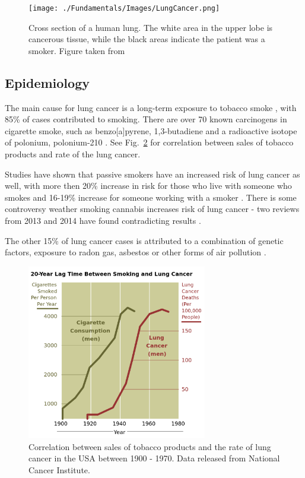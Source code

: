 \begin{figure}[H]
\begin{center}
\texttt{[image: ./Fundamentals/Images/LungCancer.png]}
\caption{Cross section of a human lung. The white area in the upper lobe is cancerous tissue, while the black areas indicate the patient was a smoker. Figure taken from \cite{LungCancer}}
\label{Fig:Cancer}
\end{center}
\end{figure}


\subsection{Epidemiology}

The main cause for lung cancer is a long-term exposure to tobacco smoke \cite{Tsao2008}, with 85\% of cases contributed to smoking. There are over 70 known carcinogens in cigarette smoke, such as benzo[a]pyrene, 1,3-butadiene and a radioactive isotope of polonium, polonium-210 \cite{Hecht2012}. See Fig.~\ref{Fig:Smoking} for correlation between sales of tobacco products and rate of the lung cancer.

Studies have shown that passive smokers have an increased risk of lung cancer as well, with more then 20\% increase in risk for those who live with someone who smokes and 16-19\% increase for someone working with a smoker \cite{Taylor2007}.
There is some controversy weather smoking cannabis increases risk of lung cancer - two reviews from 2013 and 2014 have found contradicting results \cite{Tasckin2013, Underner2014}.

The other 15\% of lung cancer cases is attributed to a combination of genetic factors, exposure to radon gas, asbestos or other forms of air pollution \cite{Alberg2010}.

\begin{figure}[H]
	\begin{center}
		\includegraphics[width=0.7\textwidth]{./Fundamentals/Images/Smoking.png}
		\caption{Correlation between sales of tobacco products and the rate of lung cancer in the USA between 1900 - 1970. Data released from National Cancer Institute.}
		\label{Fig:Smoking}
	\end{center}
\end{figure}


